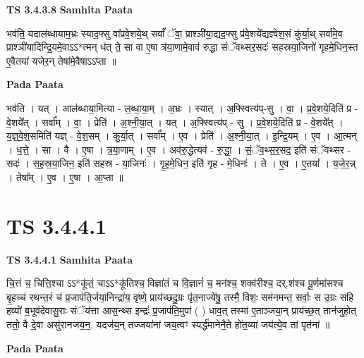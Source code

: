 \documentclass[17pt]{extarticle}
\begin{document}
\textbf{TS 3.4.3.8 } \newline
\textbf{Samhita Paata} \newline

भव॑ति॒ यदाल॑ब्धायाम॒भ्रः स्याद॒फ्सु वा᳚प्रवे॒शये॒थ् सर्वां᳚ ॅवा॒ प्राश्ञी॑या॒द्यद॒फ्सु प्र॑वे॒शये᳚द्यज्ञ्वेश॒सं कु॑र्या॒थ् सर्वा॑मे॒व प्राश्ञी॑यादिन्द्रि॒यमे॒वाऽऽ*त्मन् ध॑त् ते॒ सा वा ए॒षा त्र॑या॒णामे॒वाव॑ रुद्धा संॅवथ्सर॒सदः॑ सहस्रया॒जिनो॑ गृहमे॒धिन॒स्त ए॒वैतया॑ यजेर॒न् तेषा॑मे॒वैषाऽऽप्ता ॥ \newline

\textbf{Pada Paata} \newline

भव॑ति । यत् । आल॑ब्धाया॒मित्या - ल॒ब्धा॒या॒म् । अ॒भ्रः । स्यात् । अ॒फ्स्वित्य॑प्-सु । वा॒ । प्र॒वे॒शये॒दिति॑ प्र - वे॒शये᳚त् । सर्वा᳚म् । वा॒ । प्रेति॑ । अ॒श्नी॒या॒त् । यत् । अ॒फ्स्वित्य॑प् - सु । प्र॒वे॒शये॒दिति॑ प्र - वे॒शये᳚त् । य॒ज्ञ्॒वे॒श॒समिति॑ यज्ञ् - वे॒श॒सम् । कु॒र्या॒त् । सर्वा᳚म् । ए॒व । प्रेति॑ । अ॒श्नी॒या॒त् । इ॒न्द्रि॒यम् । ए॒व । आ॒त्मन् । ध॒त्ते॒ । सा । वै । ए॒षा । त्र॒या॒णाम् । ए॒व । अव॑रु॒द्धेत्यव॑ - रु॒द्धा॒ । सं॒ॅव॒थ्स॒र॒सद॒ इति॑ संॅवथ्सर - सदः॑ । स॒ह॒स्र॒या॒जिन॒ इति॑ सहस्र - या॒जिनः॑ । गृ॒ह॒मे॒धिन॒ इति॑ गृह - मे॒धिनः॑ । ते । ए॒व । ए॒तया᳚ । य॒जे॒र॒न्न् । तेषा᳚म् । ए॒व । ए॒षा । आ॒प्ता ॥  \newline





\section{ TS 3.4.4.1 }

\textbf{TS 3.4.4.1 } \newline
\textbf{Samhita Paata} \newline

चि॒त्तं च॒ चित्ति॒श्चा ऽऽ*कू॑तं॒ चाऽऽ*कू॑तिश्च॒ विज्ञा॑तं च वि॒ज्ञानं॑ च॒ मन॑श्च॒ शक्व॑रीश्च॒ दर्.श॑श्च पू॒र्णमा॑सश्च बृ॒हच्च॑ रथन्त॒रं च॑ प्र॒जाप॑ति॒र्जया॒निन्द्रा॑य॒ वृष्णे॒ प्राय॑च्छदु॒ग्रः पृ॑त॒नाज्ये॑षु॒ तस्मै॒ विशः॒ सम॑नमन्त॒ सर्वाः॒ स उ॒ग्रः सहि हव्यो॑ ब॒भूव॑देवासु॒राः संॅय॑त्ता आस॒न्थ्स इन्द्रः॑ प्र॒जाप॑ति॒मुपा॑ ( ) धाव॒त् तस्मा॑ ए॒ताञ्जया॒न् प्राय॑च्छ॒त् तान॑जुहो॒त् ततो॒ वै दे॒वा असु॑रानजय॒न॒. यदज॑य॒न् तज्जया॑नां जय॒त्वꣳ स्पर्द्ध॑मानेनै॒ते हो॑त॒व्या॑ जय॑त्ये॒व तां पृत॑नां ॥ \newline

\textbf{Pada Paata} \newline
\end{document}
